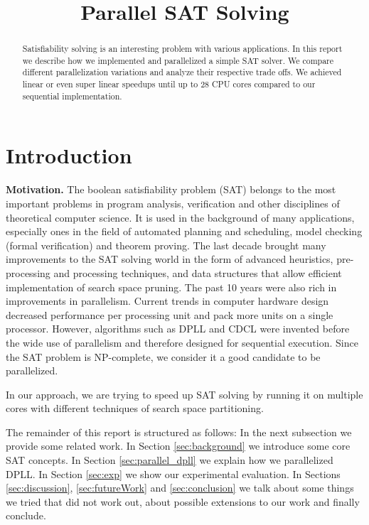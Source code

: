 \documentclass[letterpaper]{article}
\title{Parallel SAT Solving}
\newcommand{\mypar}[1]{{\bf #1.}}
\begin{document}
%
\maketitle
%

\begin{abstract}
Satisfiability solving is an interesting problem with various applications.
In this report we describe how we implemented and parallelized a simple SAT solver.
We compare different parallelization variations and analyze their respective trade offs.
We achieved linear or even super linear speedups until up to 28 CPU cores compared to our sequential implementation.
\end{abstract}

\section{Introduction}\label{sec:intro}

\mypar{Motivation}
The boolean satisfiability problem (SAT) belongs to the most important problems in program analysis, verification and other disciplines of theoretical computer science.
It is used in the background of many applications, especially ones in the field of automated planning and scheduling, model checking (formal verification) and theorem proving.
The last decade brought many improvements to the SAT solving world in the form of advanced heuristics, pre-processing and processing techniques, and data structures that allow efficient implementation of search space pruning.
The past 10 years were also rich in improvements in parallelism.
Current trends in computer hardware design decreased performance per processing unit and pack more units on a single processor.
However, algorithms such as DPLL and CDCL were invented before the wide use of parallelism and therefore designed for sequential execution.
Since the SAT problem is NP-complete, we consider it a good candidate to be parallelized.

In our approach, we are trying to speed up SAT solving by running it on multiple cores with different techniques of search space partitioning.

The remainder of this report is structured as follows:
In the next subsection we provide some related work.
In Section \ref{sec:background} we introduce some core SAT concepts.
In Section \ref{sec:parallel_dpll} we explain how we parallelized DPLL.
In Section \ref{sec:exp} we show our experimental evaluation.
In Sections \ref{sec:discussion}, \ref{sec:futureWork} and \ref{sec:conclusion} we talk about some things we tried that did not work out, about possible extensions to our work and finally conclude.
\end{document}
